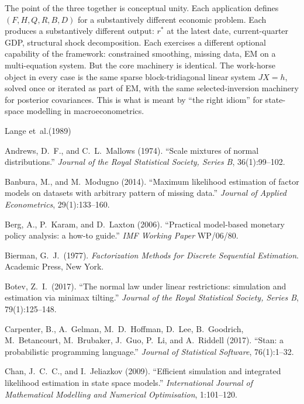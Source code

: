 \documentclass[11pt]{article}
\begin{document}
The point of the three together is conceptual unity.  Each
application defines $(F,H,Q,R,B,D)$ for a substantively different
economic problem.  Each produces a substantively different output:
$r^*$ at the latest date, current-quarter GDP, structural shock
decomposition.  Each exercises a different optional capability of
the framework: constrained smoothing, missing data, EM on a
multi-equation system.  But the core machinery is identical.  The
work-horse object in every case is the same sparse block-tridiagonal
linear system $JX=h$, solved once or iterated as part of EM, with
the same selected-inversion machinery for posterior covariances.
This is what is meant by ``the right idiom'' for state-space modelling
in macroeconometrics.

\begin{thebibliography}{Lange et~al.(1989)}

Andrews, D.\ F., and C.\ L.\ Mallows (1974).
``Scale mixtures of normal distributions.''
\emph{Journal of the Royal Statistical Society, Series B},
36(1):99--102.

Banbura, M., and M.\ Modugno (2014).
``Maximum likelihood estimation of factor models on datasets with
arbitrary pattern of missing data.''
\emph{Journal of Applied Econometrics}, 29(1):133--160.

Berg, A., P.\ Karam, and D.\ Laxton (2006).
``Practical model-based monetary policy analysis: a how-to guide.''
\emph{IMF Working Paper} WP/06/80.

Bierman, G.\ J.\ (1977).
\emph{Factorization Methods for Discrete Sequential Estimation}.
Academic Press, New York.

Botev, Z.\ I.\ (2017).
``The normal law under linear restrictions: simulation and estimation
via minimax tilting.''
\emph{Journal of the Royal Statistical Society, Series B},
79(1):125--148.

Carpenter, B., A.\ Gelman, M.\ D.\ Hoffman, D.\ Lee, B.\ Goodrich,
M.\ Betancourt, M.\ Brubaker, J.\ Guo, P.\ Li, and A.\ Riddell (2017).
``Stan: a probabilistic programming language.''
\emph{Journal of Statistical Software}, 76(1):1--32.

Chan, J.\ C.\ C., and I.\ Jeliazkov (2009).
``Efficient simulation and integrated likelihood estimation in state
space models.''
\emph{International Journal of Mathematical Modelling and Numerical
Optimisation}, 1:101--120.


\end{thebibliography}
\end{document}
